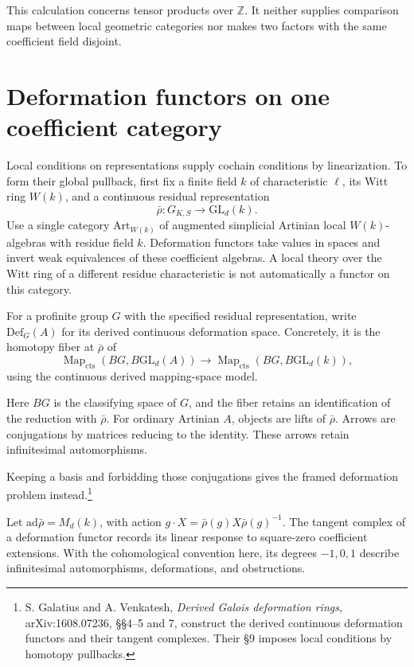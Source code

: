 This calculation concerns tensor products over \(\mathbb Z\).
It neither supplies comparison maps between local geometric categories
nor makes two factors with the same coefficient field disjoint.

\section{Deformation functors on one coefficient category}
\label{v4-arith:coefficients:sec:deformations}

Local conditions on representations supply cochain conditions by
linearization. To form their global pullback, first fix a finite field
\(k\) of characteristic \(\ell\), its Witt ring \(W(k)\), and a
continuous residual representation
\[
 \bar\rho:G_{K,S}\longrightarrow\mathrm{GL}_d(k).
\]
Use a single category \(\mathrm{Art}_{W(k)}\) of augmented simplicial
Artinian local \(W(k)\)-algebras with residue field \(k\).
Deformation functors take values in spaces and invert weak
equivalences of these coefficient algebras. A local theory over the
Witt ring of a different residue characteristic is not automatically
a functor on this category.

For a profinite group \(G\) with the specified residual representation,
write \(\mathrm{Def}_G(A)\) for its derived continuous deformation
space. Concretely, it is the homotopy fiber at \(\bar\rho\) of
\[
 \operatorname{Map}_{\mathrm{cts}}(BG,B\mathrm{GL}_d(A))
 \longrightarrow
 \operatorname{Map}_{\mathrm{cts}}(BG,B\mathrm{GL}_d(k)),
\]
using the continuous derived mapping-space model.

Here \(BG\) is the classifying space of \(G\), and the fiber retains
an identification of the reduction with \(\bar\rho\). For ordinary
Artinian \(A\), objects are lifts of \(\bar\rho\). Arrows are
conjugations by matrices reducing to the identity. These arrows retain
infinitesimal automorphisms.

Keeping a basis and forbidding those
conjugations gives the framed deformation problem instead.\footnote{
S. Galatius and A. Venkatesh, \emph{Derived Galois deformation rings},
arXiv:1608.07236, \S\S4--5 and 7, construct the derived continuous
deformation functors and their tangent complexes. Their \S9 imposes
local conditions by homotopy pullbacks.}

Let \(\mathrm{ad}\bar\rho=M_d(k)\), with action
\(g\cdot X=\bar\rho(g)X\bar\rho(g)^{-1}\).
The tangent complex of a deformation functor records its linear
response to square-zero coefficient extensions. With the cohomological
convention here, its degrees \(-1,0,1\) describe infinitesimal
automorphisms, deformations, and obstructions.

